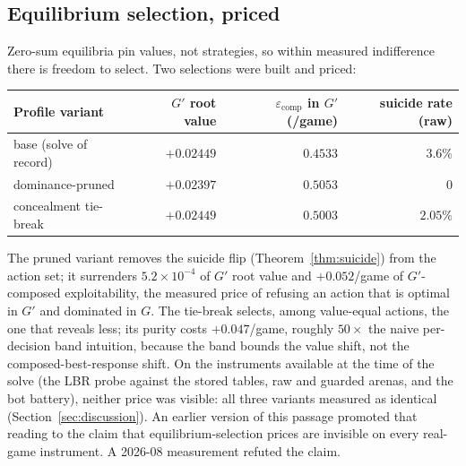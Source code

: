 \documentclass[11pt]{article}
\theoremstyle{plain}
\theoremstyle{definition}
\theoremstyle{remark}
\newcommand{\game}{\ensuremath{G}}
\newcommand{\gp}{\ensuremath{G'}}
\begin{document}
\subsection{Equilibrium selection, priced}\label{sec:selection}

Zero-sum equilibria pin values, not strategies, so within measured indifference
there is freedom to select. Two selections were built and priced:

\begin{center}\small
\begin{tabular}{@{}lrrr@{}}
\toprule
Profile variant & $\gp$ root value & $\varepsilon_{\text{comp}}$ in $\gp$ (/game) & suicide rate (raw)\\
\midrule
base (solve of record) & $+0.02449$ & $0.4533$ & $3.6\%$\\
dominance-pruned & $+0.02397$ & $0.5053$ & $0$\\
concealment tie-break & $+0.02449$ & $0.5003$ & $2.05\%$\\
\bottomrule
\end{tabular}
\end{center}

The pruned variant removes the suicide flip (Theorem~\ref{thm:suicide}) from the
action set; it surrenders $5.2\times10^{-4}$ of $\gp$ root value and
$+0.052$/game of $\gp$-composed exploitability, the measured price of refusing
an action that is optimal in $\gp$ and dominated in $\game$. The tie-break
selects, among value-equal actions, the one that reveals less; its purity costs
$+0.047$/game, roughly $50\times$ the naive per-decision band intuition, because
the band bounds the value shift, not the composed-best-response shift. On the
instruments available at the time of the solve (the LBR probe against the
stored tables, raw and guarded arenas, and the bot battery), neither price was
visible: all three variants measured as identical
(Section~\ref{sec:discussion}). An earlier version of this passage promoted
that reading to the claim that equilibrium-selection prices are invisible on
every real-game instrument. A 2026-08 measurement refuted the claim.
\end{document}
